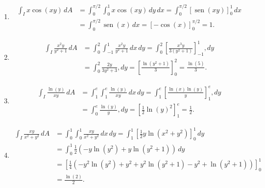 \documentclass[
  spanish,
  a4paper,
]{scrreport}
\theoremstyle{definition}
\theoremstyle{remark}
\begin{document}
\begin{tcolorbox}[enhanced jigsaw, arc=.35mm, bottomrule=.15mm, bottomtitle=1mm, breakable, colback=white, colbacktitle=quarto-callout-tip-color!10!white, colframe=quarto-callout-tip-color-frame, coltitle=black, left=2mm, leftrule=.75mm, opacityback=0, opacitybacktitle=0.6, rightrule=.15mm, title=\textcolor{quarto-callout-tip-color}{\faLightbulb}\hspace{0.5em}{Solución}, titlerule=0mm, toprule=.15mm, toptitle=1mm]

\begin{enumerate}
\def\labelenumi{\alph{enumi}.}
\item
  \begin{align*}
   \int_I x\cos(xy)\,dA
   &= \int_0^{\pi/2}\int_0^{1}x\cos(xy)\,dy\,dx
   = \int_0^{\pi/2}[\operatorname{sen}(xy)]_0^1\,dx \\
   &= \int_0^{\pi/2}\operatorname{sen}(x)\,dx 
   = [-\cos(x)]_0^{\pi/2}
   = 1.
   \end{align*}
\item
  \begin{align*}
  \int_I \frac{x^2y}{y^2+1}\,dA
  &= \int_0^2\int_{-1}^1 \frac{x^2y}{y^2+1}\,dx\,dy
  = \int_0^2 \left[\frac{x^3y}{3(y^2+1)}\right]_{-1}^1,dy \\
  &= \int_0^2 \frac{2y}{3y^2+3},dy 
  = \left[\frac{\ln(y^2+1)}{3}\right]_0^2 
  = \frac{\ln(5)}{3}.
  \end{align*}
\item
  \begin{align*}
  \int_I \frac{\ln(y)}{xy}\,dA
  &= \int_1^e\int_1^e \frac{\ln(y)}{xy}\,dx\,dy
  = \int_1^e \left[\frac{\ln(x)\ln(y)}{y}\right]_1^e,dy \\
  &= \int_0^e \frac{\ln(y)}{y},dy 
  = \left[\frac{1}{2}\ln(y)^2\right]_1^e 
  = \frac{1}{2}.
  \end{align*}
\item
  \begin{align*}
  \int_I \frac{xy}{x^2+y^2}\,dA
  &= \int_0^1\int_0^1 \frac{xy}{x^2+y^2}\,dx\,dy
  = \int_1^1 \left[\frac{1}{2}y\ln(x^2+y^2)\right]_0^1\,dy \\
  &= \int_0^1 \frac{1}{2}(-y\ln(y^2)+y\ln(y^2+1))\,dy  \\
  &= \left[\frac{1}{4}(-y^2\ln(y^2)+y^2+y^2\ln(y^2+1)-y^2+\ln(y^2+1)) \right]_0^1 \\
  &= \frac{\ln(2)}{2}.
  \end{align*}
\end{enumerate}

\end{tcolorbox}
\end{document}
